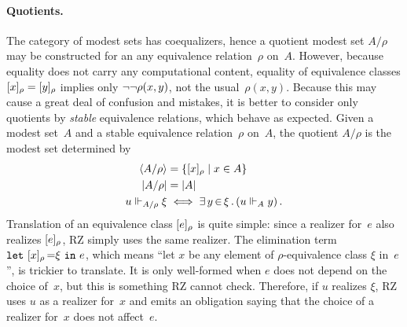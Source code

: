 \paragraph{Quotients.}
%
The category of modest sets has coequalizers, hence a quotient modest
set $A/\rho$ may be constructed for an any equivalence relation~$\rho$
on~$A$. However, because equality does not carry any computational
content, equality of equivalence classes $[x]_{\rho} =
[y]_{\rho}$ implies only $\lnot \lnot \rho(x,y)$, not the
usual~$\rho(x,y)$. Because this may cause a great deal of confusion
and mistakes, it is better to consider only quotients by \emph{stable}
equivalence relations, which behave as expected.
%
Given a modest set~$A$ and a stable equivalence relation~$\rho$
on~$A$, the quotient $A/\rho$ is the modest set determined by
%
\begin{align*}
  \langle A/\rho \rangle &= \{[x]_{\rho} \mid x \in A\} \\
  |A/\rho| &= |A| \\
  u \Vdash_{A/\rho} \xi &\iff \exists\, y \,{\in}\, \xi\,.\left(u \Vdash_A y\right).
\end{align*}
%
Translation of an equivalence class $[e]_{\rho}$ is quite
simple: since a realizer for~$e$ also realizes $[e]_{\rho}$, RZ
simply uses the same realizer. The elimination term
$\texttt{let}\ [x]_{\rho}\,{=}\xi\ \texttt{in}\ e$, which means ``let $x$ be any element
of $\rho$-equivalence class $\xi$ in~$e$'', is trickier to translate.
It is only well-formed when $e$ does not depend on the choice of~$x$,
but this is something RZ cannot check. Therefore, if $u$ realizes
$\xi$, RZ uses $u$ as a realizer for~$x$ and emits an obligation
saying that the choice of a realizer for~$x$ does not affect~$e$.

